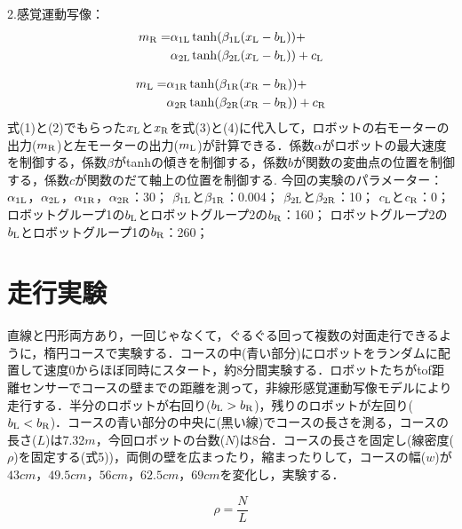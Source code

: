 \documentclass[twocolumn]{jarticle} %
\begin{document}
2.感覚運動写像：
\begin{equation}
\begin{aligned}
  m_{\rm R} = &\alpha_{1{\rm L}} \tanh(\beta_{1{\rm L}}(x_{\rm L} - b_{\rm L})) + \\
        &\alpha_{2{\rm L}} \tanh(\beta_{2{\rm L}}(x_{\rm L} - b_{\rm L})) + c_{\rm L}
\end{aligned}
\end{equation}

\begin{equation}
\begin{aligned}
  m_{\rm L} = &\alpha_{1{\rm R}} \tanh(\beta_{1{\rm R}}(x_{\rm R} - b_{\rm R})) + \\
        &\alpha_{2{\rm R}}\tanh(\beta_{2{\rm R}}(x_{\rm R} - b_{\rm R})) + c_{\rm R}
\end{aligned}
\end{equation}
式(1)と(2)でもらった$x_{\rm L}$と$x_{\rm R}$を式(3)と(4)に代入して，ロボットの右モーターの出力($m_{\rm R}$)と左モーターの出力($m_{\rm L}$)が計算できる．係数$\alpha$がロボットの最大速度を制御する，係数$\beta$が{\rm tanh}の傾きを制御する，係数$b$が関数の変曲点の位置を制御する，係数$c$が関数のだて軸上の位置を制御する. 
今回の実験のパラメーター：
$\alpha_{1{\rm L}}$，$\alpha_{2{\rm L}}$，$\alpha_{1{\rm R}}$，$\alpha_{2{\rm R}}$：30；
$\beta_{1{\rm L}}$と$\beta_{1{\rm R}}$：0.004；
$\beta_{2{\rm L}}$と$\beta_{2{\rm R}}$：10；
$c_{\rm L}$と$c_{\rm R}$：0；
ロボットグループ1の$b_{\rm L}$とロボットグループ2の$b_{\rm R}$：160；
ロボットグループ2の$b_{\rm L}$とロボットグループ1の$b_{\rm R}$：260；


\section{走行実験}
直線と円形両方あり，一回じゃなくて，ぐるぐる回って複数の対面走行できるように，楕円コースで実験する．コースの中(青い部分)にロボットをランダムに配置して速度0からほぼ同時にスタート，約8分間実験する．ロボットたちがtof距離センサーでコースの壁までの距離を測って，非線形感覚運動写像モデルにより走行する．半分のロボットが右回り($b_{\rm L}>b_{\rm R}$)，残りのロボットが左回り($b_{\rm L}<b_{\rm R}$)．コースの青い部分の中央に(黒い線)でコースの長さを測る，コースの長さ($L$)は7.32$m$，今回ロボットの台数($N$)は8台．コースの長さを固定し(線密度($\rho$)を固定する(式5))，両側の壁を広まったり，縮まったりして，コースの幅($w$)が$43cm$，$49.5cm$，$56cm$，$62.5cm$，$69cm$を変化し，実験する．

\begin{equation}
\rho = \frac{N}{L}
\end{equation}
\end{document}
